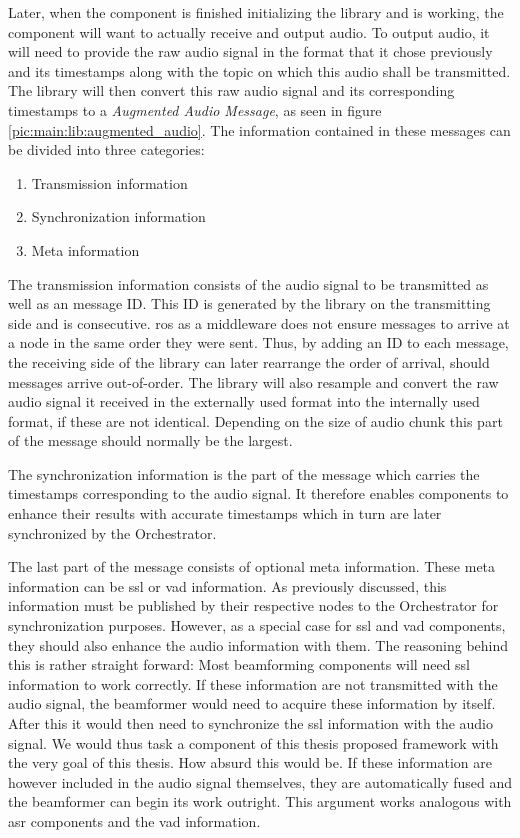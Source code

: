Later, when the component is finished initializing the library and is working, %
the component will want to actually receive and output audio.
To output audio, it will need to provide the raw audio signal in the format that it chose previously and its timestamps along with the topic on which this audio shall be transmitted.
The library will then convert this raw audio signal and its corresponding timestamps to a \textit{Augmented Audio Message}, as seen in figure \ref{pic:main:lib:augmented_audio}.
The information contained in these messages can be divided into three categories:
\begin{enumerate}
	\item Transmission information
	\item Synchronization information
	\item Meta information
\end{enumerate}
The transmission information consists of the audio signal to be transmitted as well as an message ID.
This ID is generated by the library on the transmitting side and is consecutive.
\gls{ros} as a middleware does not ensure messages to arrive at a node in the same order they were sent.
Thus, by adding an ID to each message, the receiving side of the library can later rearrange the order of arrival, should messages arrive out-of-order.
The library will also resample and convert the raw audio signal it received in the externally used format into the internally used format, if these are not identical.
Depending on the size of audio chunk this part of the message should normally be the largest.

The synchronization information is the part of the message which carries the timestamps corresponding to the audio signal.
It therefore enables components to enhance their results with accurate timestamps which in turn are later synchronized by the Orchestrator.

The last part of the message consists of optional meta information.
These meta information can be \gls{ssl} or \gls{vad} information.
As previously discussed, this information must be published by their respective nodes to the Orchestrator for synchronization purposes.
However, as a special case for \gls{ssl} and \gls{vad} components, they should also enhance the audio information with them.
The reasoning behind this is rather straight forward:
Most beamforming components will need \gls{ssl} information to work correctly.
If these information are not transmitted with the audio signal, the beamformer would need to acquire these information by itself.
After this it would then need to synchronize the \gls{ssl} information with the audio signal.
We would thus task a component of this thesis proposed framework with the very goal of this thesis.
How absurd this would be.
If these information are however included in the audio signal themselves, they are automatically fused and the beamformer can begin its work outright.
This argument works analogous with \gls{asr} components and the \gls{vad} information.

